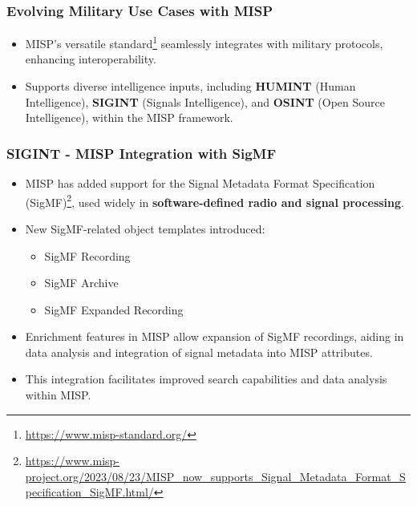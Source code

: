 \begin{frame}
  \frametitle{Evolving Military Use Cases with MISP}
  \begin{itemize}
      \item MISP's versatile standard\footnote{\url{https://www.misp-standard.org/}} seamlessly integrates with military protocols, enhancing interoperability.
      \item Supports diverse intelligence inputs, including {\bf HUMINT} (Human Intelligence), {\bf SIGINT} (Signals Intelligence), and {\bf OSINT} (Open Source Intelligence), within the MISP framework.
  \end{itemize}                                                                                                                                             
\end{frame}

\begin{frame}
    \frametitle{SIGINT - MISP Integration with SigMF}
  \begin{itemize}
      \item MISP has added support for the Signal Metadata Format Specification (SigMF)\footnote{\url{https://www.misp-project.org/2023/08/23/MISP_now_supports_Signal_Metadata_Format_Specification_SigMF.html/}}, used widely in {\bf software-defined radio and signal processing}.
    \item New SigMF-related object templates introduced:
      \begin{itemize}
        \item SigMF Recording
        \item SigMF Archive
        \item SigMF Expanded Recording
      \end{itemize}
    \item Enrichment features in MISP allow expansion of SigMF recordings, aiding in data analysis and integration of signal metadata into MISP attributes.
    \item This integration facilitates improved search capabilities and data analysis within MISP.
  \end{itemize}
\end{frame}

